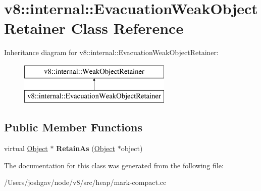 \hypertarget{classv8_1_1internal_1_1_evacuation_weak_object_retainer}{}\section{v8\+:\+:internal\+:\+:Evacuation\+Weak\+Object\+Retainer Class Reference}
\label{classv8_1_1internal_1_1_evacuation_weak_object_retainer}
Inheritance diagram for v8\+:\+:internal\+:\+:Evacuation\+Weak\+Object\+Retainer\+:\begin{figure}[H]
\begin{center}
\leavevmode
\includegraphics[height=2.000000cm]{classv8_1_1internal_1_1_evacuation_weak_object_retainer}
\end{center}
\end{figure}
\subsection*{Public Member Functions}
\begin{DoxyCompactItemize}
\item 
virtual \hyperlink{classv8_1_1internal_1_1_object}{Object} $\ast$ {\bfseries Retain\+As} (\hyperlink{classv8_1_1internal_1_1_object}{Object} $\ast$object)\hypertarget{classv8_1_1internal_1_1_evacuation_weak_object_retainer_a25249ad5ec0b0c4e08fb8efc70f032fe}{}\label{classv8_1_1internal_1_1_evacuation_weak_object_retainer_a25249ad5ec0b0c4e08fb8efc70f032fe}

\end{DoxyCompactItemize}


The documentation for this class was generated from the following file\+:\begin{DoxyCompactItemize}
\item 
/\+Users/joshgav/node/v8/src/heap/mark-\/compact.\+cc\end{DoxyCompactItemize}
